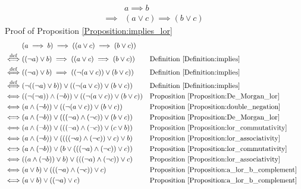\begin{prop}
\label{Proposition:implies_lor}
\begin{align*}
& a \implies b \\
\implies & (a \lor c) \implies (b \lor c)
\end{align*}
Proof of Proposition \ref{Proposition:implies_lor}
\begin{align*}
& (a \implies b) \implies ((a \lor c) \implies (b \lor c)) \\
\overset{\operatorname{def}}{\iff} & ((\lnot a) \lor b) \implies ((a \lor c) \implies (b \lor c))
&& \text{Definition \ref{Definition:implies}} \\
\overset{\operatorname{def}}{\iff} & ((\lnot a) \lor b) \implies ((\lnot (a \lor c)) \lor (b \lor c))
&& \text{Definition \ref{Definition:implies}} \\
\overset{\operatorname{def}}{\iff} & (\lnot ((\lnot a) \lor b)) \lor ((\lnot (a \lor c)) \lor (b \lor c))
&& \text{Definition \ref{Definition:implies}} \\
\iff & ((\lnot (\lnot a)) \land (\lnot b)) \lor ((\lnot (a \lor c)) \lor (b \lor c))
&& \text{Proposition \ref{Proposition:De_Morgan_lor}} \\
\iff & (a \land (\lnot b)) \lor ((\lnot (a \lor c)) \lor (b \lor c))
&& \text{Proposition \ref{Proposition:double_negation}} \\
\iff & (a \land (\lnot b)) \lor (((\lnot a) \land (\lnot c)) \lor (b \lor c))
&& \text{Proposition \ref{Proposition:De_Morgan_lor}} \\
\iff & (a \land (\lnot b)) \lor (((\lnot a) \land (\lnot c)) \lor (c \lor b))
&& \text{Proposition \ref{Proposition:lor_commutativity}} \\
\iff & (a \land (\lnot b)) \lor ((((\lnot a) \land (\lnot c)) \lor c) \lor b)
&& \text{Proposition \ref{Proposition:lor_associativity}} \\
\iff & (a \land (\lnot b)) \lor (b \lor (((\lnot a) \land (\lnot c)) \lor c))
&& \text{Proposition \ref{Proposition:lor_commutativity}} \\
\iff & ((a \land (\lnot b)) \lor b) \lor (((\lnot a) \land (\lnot c)) \lor c)
&& \text{Proposition \ref{Proposition:lor_associativity}} \\
\iff & (a \lor b) \lor (((\lnot a) \land (\lnot c)) \lor c)
&& \text{Proposition \ref{Proposition:a_lor_b_complement}} \\
\iff & (a \lor b) \lor ((\lnot a) \lor c)
&& \text{Proposition \ref{Proposition:a_lor_b_complement}} \\

\end{align*}
\end{prop}

